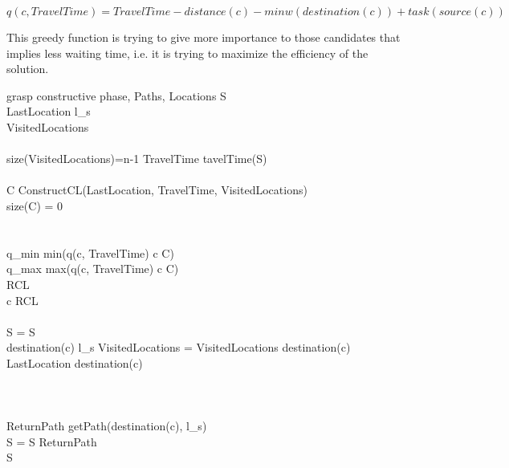 \documentclass[]{report}
\begin{document}
$$ q(c, TravelTime) = TravelTime - distance(c) - minw(destination(c)) + task(source(c))$$

This greedy function is trying to give more importance to those candidates that implies less waiting time, i.e. it is trying to maximize the efficiency of the solution.

\begin{pseudocode}{grasp constructive phase}{\alpha, Paths, Locations}
\label{pc:constructive_phase}
	S \GETS \varnothing\\
	LastLocation \GETS l_{s}\\
	VisitedLocations \GETS \varnothing\\
	\\
	\WHILE \NOT size(VisitedLocations)=n-1 \DO
	\BEGIN
		TravelTime \GETS tavelTime(S)\\
		\\
		C \GETS ConstructCL(LastLocation, TravelTime, VisitedLocations)\\
		\IF size(C) = 0 \THEN
			\\
		
		\\
		\\
		q_{min} \GETS min(q(c, TravelTime) \quad \forall c \in C)\\
		q_{max} \GETS max(q(c, TravelTime) \quad \forall c \in C)\\
		RCL \\
		 c \in RCL \\
		\\
		S = S \\
		\IF destination(c) \neq l_{s} \THEN
			VisitedLocations = VisitedLocations \cup destination(c)\\
		LastLocation \GETS destination(c)\\
	\END\\
	\\
	\\
	ReturnPath \GETS getPath(destination(c), l_{s})\\
	S = S \cup ReturnPath\\
	
	\RETURN S

\end{pseudocode}
\end{document}
